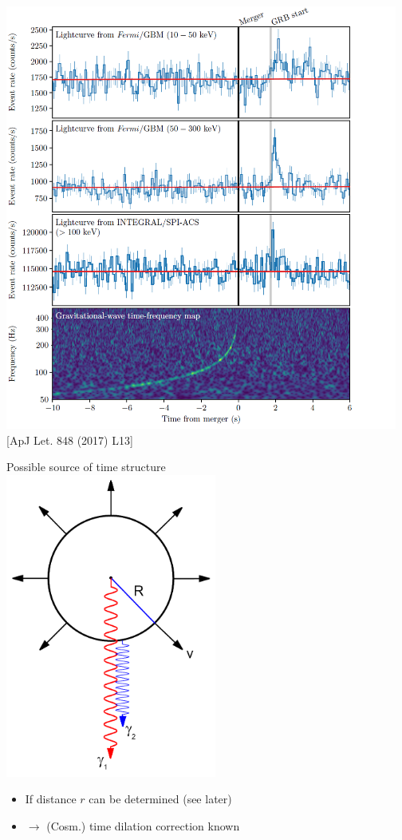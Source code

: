 \newpage
%
\begin{center}
\includegraphics[keepaspectratio,height=14cm]{GW-GRB}\\
{\large [ApJ Let. 848 (2017) L13]}
\end{center}

\Tr
{}%
\begin{center}
{\red Possible source of time structure}\\[5mm]
\includegraphics[keepaspectratio,height=10cm]{grb-shell3}
\end{center}
%
\begin{itemize}
\item If distance $r$ can be determined (see later)
\item[] $\rightarrow$ (Cosm.) time dilation correction known
\end{itemize}

